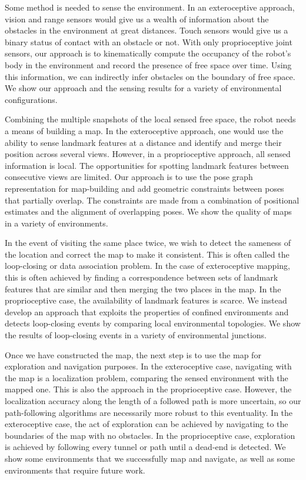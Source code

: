 Some method is needed to sense the environment.  In an exteroceptive approach, vision and range sensors would give us a wealth of information about the obstacles in the environment at great distances.  Touch sensors would give us a binary status of contact with an obstacle or not.  With only proprioceptive joint sensors, our approach is to kinematically compute the occupancy of the robot’s body in the environment and record the presence of free space over time.  Using this information, we can indirectly infer obstacles on the boundary of free space.  We show our approach and the sensing results for a variety of environmental configurations.

Combining the multiple snapshots of the local sensed free space, the robot needs a means of building a map.  In the exteroceptive approach, one would use the ability to sense landmark features at a distance and identify and merge their position across several views.  However, in a proprioceptive approach, all sensed information is local.  The opportunities for spotting landmark features between consecutive views are limited.  Our approach is to use the pose graph representation for map-building and add geometric constraints between poses that partially overlap.  The constraints are made from a combination of positional estimates and the alignment of overlapping poses.  We show the quality of maps in a variety of environments.

In the event of visiting the same place twice, we wish to detect the sameness of the location and correct the map to make it consistent.  This is often called the loop-closing or data association problem.  In the case of exteroceptive mapping, this is often achieved by finding a correspondence between sets of landmark features that are similar and then merging the two places in the map.  In the proprioceptive case, the availability of landmark features is scarce.   We instead develop an approach that exploits the properties of confined environments and detects loop-closing events by comparing local environmental topologies.  We show the results of loop-closing events in a variety of environmental junctions.

Once we have constructed the map, the next step is to use the map for exploration and navigation purposes.  In the exteroceptive case, navigating with the map is a localization problem, comparing the sensed environment with the mapped one.  This is also the approach in the proprioceptive case.  However, the localization accuracy along the length of a followed path is more uncertain, so our path-following algorithms are necessarily more robust to this eventuality.   In the exteroceptive case, the act of exploration can be achieved by navigating to the boundaries of the map with no obstacles.  In the proprioceptive case, exploration is achieved by following every tunnel or path until a dead-end is detected.  We show some environments that we successfully map and navigate, as well as some environments that require future work. 


